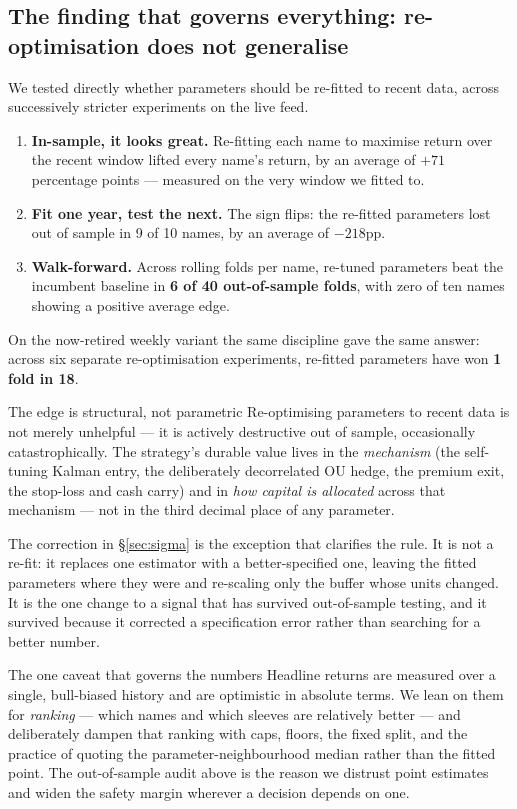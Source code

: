 \documentclass[11pt]{article}
\begin{document}
\subsection{The finding that governs everything: re-optimisation does not generalise}
\label{sec:noreopt}
We tested directly whether parameters should be re-fitted to recent data, across successively
stricter experiments on the live feed.
\begin{enumerate}[topsep=2pt,itemsep=2pt]
\item \textbf{In-sample, it looks great.} Re-fitting each name to maximise return over the recent
      window lifted every name's return, by an average of $+71$ percentage points --- measured on
      the very window we fitted to.
\item \textbf{Fit one year, test the next.} The sign flips: the re-fitted parameters lost out of
      sample in 9 of 10 names, by an average of $-218$pp.
\item \textbf{Walk-forward.} Across rolling folds per name, re-tuned parameters beat the
      incumbent baseline in \textbf{6 of 40 out-of-sample folds}, with zero of ten names showing
      a positive average edge.
\end{enumerate}
On the now-retired weekly variant the same discipline gave the same answer: across six separate
re-optimisation experiments, re-fitted parameters have won \textbf{1 fold in 18}.

\begin{keybox}{The edge is structural, not parametric}
Re-optimising parameters to recent data is not merely unhelpful --- it is actively destructive out
of sample, occasionally catastrophically. The strategy's durable value lives in the
\emph{mechanism} (the self-tuning Kalman entry, the deliberately decorrelated OU hedge, the
premium exit, the stop-loss and cash carry) and in \emph{how capital is allocated} across that
mechanism --- not in the third decimal place of any parameter.

The correction in \S\ref{sec:sigma} is the exception that clarifies the rule. It is not a re-fit:
it replaces one estimator with a better-specified one, leaving the fitted parameters where they
were and re-scaling only the buffer whose units changed. It is the one change to a signal that
has survived out-of-sample testing, and it survived because it corrected a specification error
rather than searching for a better number.
\end{keybox}

\begin{keybox}{The one caveat that governs the numbers}
Headline returns are measured over a single, bull-biased history and are optimistic in absolute
terms. We lean on them for \emph{ranking} --- which names and which sleeves are relatively better
--- and deliberately dampen that ranking with caps, floors, the fixed split, and the practice of
quoting the parameter-neighbourhood median rather than the fitted point. The out-of-sample audit
above is the reason we distrust point estimates and widen the safety margin wherever a decision
depends on one.
\end{keybox}
\end{document}
